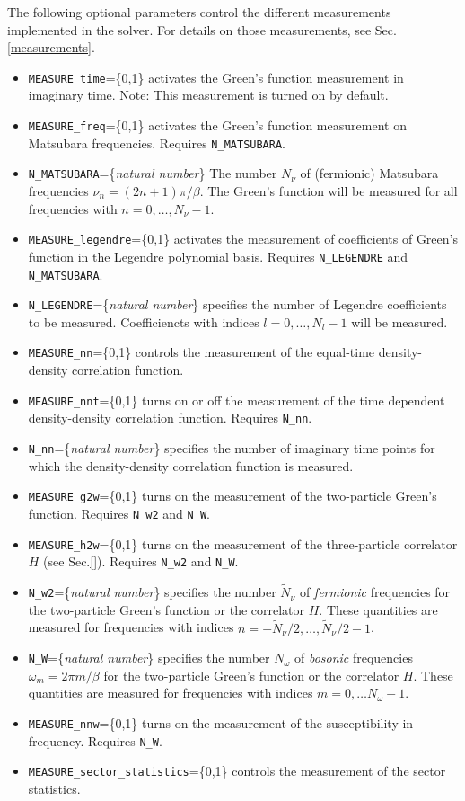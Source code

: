 \documentclass[aps,prb,floatfix,superscriptaddress,twocolumn,notitlepage]{revtex4-1}
\begin{document}
The following optional parameters control the different measurements implemented in the solver. For details on those measurements, see Sec. \ref{measurements}.
\begin{itemize}
\item \verb#MEASURE_time#=\{0,1\} activates the Green's function measurement in imaginary time. Note: This measurement is turned on by default.
\item \verb#MEASURE_freq#=\{0,1\} activates the Green's function measurement on Matsubara frequencies. Requires \verb#N_MATSUBARA#.
\item \verb#N_MATSUBARA#=\{\emph{natural number}\} The number $N_{\nu}$ of (fermionic) Matsubara frequencies $\nu_{n}=(2n+1)\pi/\beta$. The Green's function will be measured for all frequencies with $n=0,\ldots,N_{\nu}-1$.
\item \verb#MEASURE_legendre#=\{0,1\} activates the measurement of coefficients of Green's function in the Legendre polynomial basis. Requires \verb#N_LEGENDRE# and \verb#N_MATSUBARA#.
\item \verb#N_LEGENDRE#=\{\emph{natural number}\} specifies the number of Legendre coefficients to be measured. Coefficiencts with indices $l=0,\ldots,N_{l}-1$ will be measured.
\item \verb#MEASURE_nn#=\{0,1\} controls the measurement of the equal-time density-density correlation function.
\item \verb#MEASURE_nnt#=\{0,1\} turns on or off the measurement of the time dependent density-density correlation function. Requires \verb#N_nn#.
\item \verb#N_nn#=\{\emph{natural number}\} specifies the number of imaginary time points for which the density-density correlation function is measured.
\item \verb#MEASURE_g2w#=\{0,1\} turns on the measurement of the two-particle Green's function. Requires \verb#N_w2# and \verb#N_W#.
\item \verb#MEASURE_h2w#=\{0,1\} turns on the measurement of the three-particle correlator $H$ (see Sec.\ref{}). Requires \verb#N_w2# and \verb#N_W#.
\item \verb#N_w2#=\{\emph{natural number}\} specifies the number $\tilde{N}_{\nu}$ of \emph{fermionic} frequencies for the two-particle Green's function or the correlator $H$. These quantities are measured for frequencies with indices $n=-\tilde{N}_{\nu}/2,\ldots,\tilde{N}_{\nu}/2-1$.
\item \verb#N_W#=\{\emph{natural number}\} specifies the number $N_{\omega}$ of \emph{bosonic} frequencies $\omega_{m}=2\pi m/\beta$ for the two-particle Green's function or the correlator $H$. These quantities are measured for frequencies with indices $m=0,\ldots N_{\omega}-1$.
\item \verb#MEASURE_nnw#=\{0,1\} turns on the measurement of the susceptibility in frequency. Requires \verb#N_W#.
\item \verb#MEASURE_sector_statistics#=\{0,1\} controls the measurement of the sector statistics.


\end{itemize}
\end{document}
